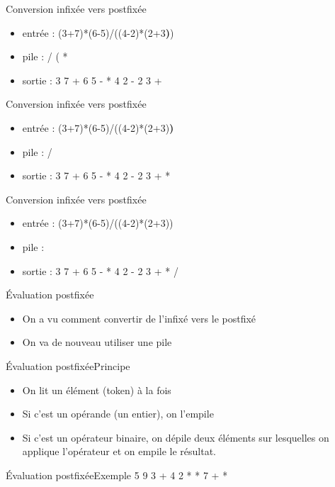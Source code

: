 \documentclass[12pt,a4paper]{beamer}
\begin{document}
\begin{frame}{Conversion infixée vers postfixée}
\begin{itemize}
\item entrée : (3+7)*(6-5)/((4-2)*(2+3\textbf{)})
\item pile : / ( * 
\item sortie : 3 7 + 6 5 - * 4 2 - 2 3 +
\end{itemize}
\end{frame}

\begin{frame}{Conversion infixée vers postfixée}
\begin{itemize}
\item entrée : (3+7)*(6-5)/((4-2)*(2+3)\textbf{)}
\item pile : / 
\item sortie : 3 7 + 6 5 - * 4 2 - 2 3 + * 
\end{itemize}
\end{frame}

\begin{frame}{Conversion infixée vers postfixée}
\begin{itemize}
\item entrée : (3+7)*(6-5)/((4-2)*(2+3))
\item pile : 
\item sortie : 3 7 + 6 5 - * 4 2 - 2 3 + * /
\end{itemize}
\end{frame}


\begin{frame}{Évaluation postfixée}
\begin{itemize}
\item On a vu comment convertir de l'infixé vers le postfixé
\item On va de nouveau utiliser une pile
\end{itemize}
\end{frame}

\begin{frame}{Évaluation postfixée}{Principe}
\begin{itemize}
\item On lit un élément (token) à la fois
\item Si c'est un opérande (un entier), on l'empile
\item Si c'est un opérateur binaire, on dépile deux éléments sur lesquelles on applique l'opérateur et  on empile le résultat.
\end{itemize}
\end{frame}

\begin{frame}{Évaluation postfixée}{Exemple}
5 9 3 + 4 2 * * 7 + *
\end{frame}
\end{document}
